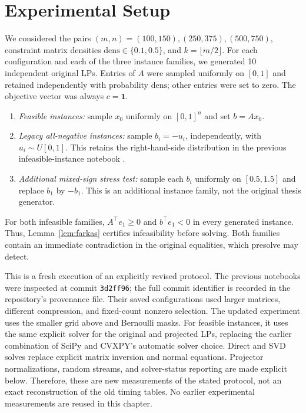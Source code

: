 \documentclass[12pt,letterpaper,oneside]{report}
\theoremstyle{definition}
\begin{document}
\section{Experimental Setup}
We considered the pairs $(m,n)=(100,150),(250,375),(500,750)$,
constraint matrix densities $\mathrm{dens}\in\{0.1,0.5\}$, and
$k=\lfloor m/2\rfloor$. For each configuration and each of the three
instance families, we generated 10 independent original LPs. Entries
of $A$ were sampled uniformly on $[0,1]$ and retained independently with
probability $\mathrm{dens}$; other entries were set to zero.
The objective vector was always $c=\mathbf{1}$.

\begin{enumerate}[label=\arabic*)]
\item \emph{Feasible instances:} sample $x_0$ uniformly on $[0,1]^n$
and set $b=Ax_0$.
\item \emph{Legacy all-negative instances:} sample
$b_i=-u_i$, independently, with $u_i\sim U[0,1]$.
This retains the right-hand-side distribution in the previous
infeasible-instance notebook \cite{legacyrepo}.
\item \emph{Additional mixed-sign stress test:} sample each $b_i$
uniformly on $[0.5,1.5]$ and replace $b_1$ by $-b_1$.
This is an additional instance family, not the original thesis generator.
\end{enumerate}
For both infeasible families, $A^\top e_1\geq0$ and
$b^\top e_1<0$ in every generated instance. Thus, Lemma~\ref{lem:farkas}
certifies infeasibility before solving. Both families contain an immediate
contradiction in the original equalities, which presolve may detect.

This is a fresh execution of an explicitly revised protocol. The previous
notebooks \cite{legacyrepo} were inspected at commit
\texttt{3d2ff96}; the full commit identifier is recorded in the
repository's provenance file. Their saved configurations used larger
matrices, different compression, and fixed-count nonzero selection.
The updated experiment uses the smaller grid above and Bernoulli masks.
For feasible instances, it uses the same explicit solver for the original
and projected LPs, replacing the earlier combination of SciPy and
CVXPY's automatic solver choice. Direct and SVD solves replace explicit
matrix inversion and normal equations. Projector normalizations,
random streams, and solver-status reporting are made explicit below.
Therefore, these are new measurements of the stated protocol, not an
exact reconstruction of the old timing tables. No earlier experimental
measurements are reused in this chapter.
\end{document}

